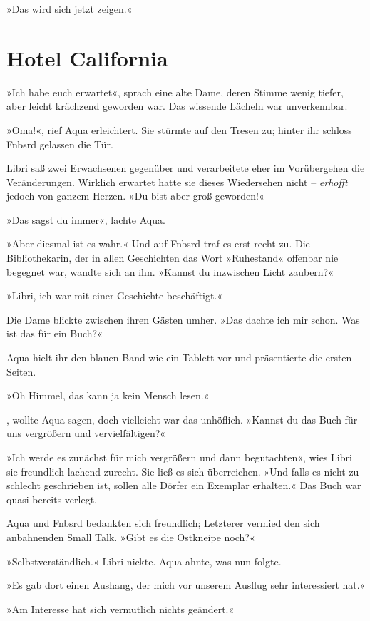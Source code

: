»Das wird sich jetzt zeigen.«


\chapter{Hotel California}

»Ich habe euch erwartet«, sprach eine alte Dame, deren Stimme wenig tiefer, aber leicht krächzend geworden war. Das wissende Lächeln war unverkennbar.

»Oma!«, rief Aqua erleichtert. Sie stürmte auf den Tresen zu; hinter ihr schloss Fnbsrd gelassen die Tür.

Libri saß zwei Erwachsenen gegenüber und verarbeitete eher im Vorübergehen die Veränderungen. Wirklich erwartet hatte sie dieses Wiedersehen nicht – \emph{erhofft} jedoch von ganzem Herzen. »Du bist aber groß geworden!«

»Das sagst du immer«, lachte Aqua.

»Aber diesmal ist es wahr.« Und auf Fnbsrd traf es erst recht zu. Die Bibliothekarin, der in allen Geschichten das Wort »Ruhestand« offenbar nie begegnet war, wandte sich an ihn. »Kannst du inzwischen Licht zaubern?«

»Libri, ich war mit einer Geschichte beschäftigt.«

Die Dame blickte zwischen ihren Gästen umher. »Das dachte ich mir schon. Was ist das für ein Buch?«

Aqua hielt ihr den blauen Band wie ein Tablett vor und präsentierte die ersten Seiten.

»Oh Himmel, das kann ja kein Mensch lesen.«

, wollte Aqua sagen, doch vielleicht war das unhöflich. »Kannst du das Buch für uns vergrößern und vervielfältigen?«

»Ich werde es zunächst für mich vergrößern und dann begutachten«, wies Libri sie freundlich lachend zurecht. Sie ließ es sich überreichen. »Und falls es nicht zu schlecht geschrieben ist, sollen alle Dörfer ein Exemplar erhalten.« Das Buch war quasi bereits verlegt.

Aqua und Fnbsrd bedankten sich freundlich; Letzterer vermied den sich anbahnenden Small Talk. »Gibt es die Ostkneipe noch?«

»Selbstverständlich.« Libri nickte. Aqua ahnte, was nun folgte.

»Es gab dort einen Aushang, der mich vor unserem Ausflug sehr interessiert hat.«

»Am Interesse hat sich vermutlich nichts geändert.«

